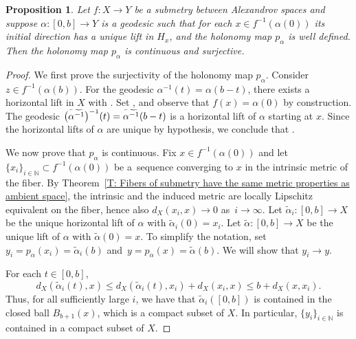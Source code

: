 \documentclass[10pt,a4paper]{amsart}
\numberwithin{equation}{section}
\newtheorem{prop}[thm]{Proposition}
\theoremstyle{definition}
\newcommand{\N}{\mathbb{N}} %
\begin{document}
\begin{prop}\label{L: holonomy maps are surjective and continuous}
Let $f\colon X\to Y$ be a submetry between Alexandrov spaces and
suppose $\alpha\colon [0,b]\to Y$ is a geodesic such that for each $x\in f^{-1}(\alpha(0))$ its initial direction has a unique lift in $H_x$, and the holonomy map $p_\alpha$ is well defined. Then the holonomy map $p_\alpha$ is continuous and surjective.
\end{prop}



\begin{proof}

We first prove the surjectivity of the holonomy map $p_\alpha$. Consider $z\in f^{-1}(\alpha(b))$. For the geodesic $\alpha^{-1}(t)= \alpha(b-t)$, there exists a horizontal lift  in $X$ with . Set , and observe that $f(x) = \alpha(0)$ by construction. The geodesic $\smash{\bigl(\widetilde{\alpha^{-1}}\bigr)^{-1}(t)} = \smash{\widetilde{\alpha^{-1}}(b-t)}$ is a horizontal lift of $\alpha$ starting at $x$. Since the horizontal lifts of $\alpha$ are unique by hypothesis, we conclude that .

We now prove that $p_\alpha$ is continuous. Fix $x\in f^{-1}(\alpha(0))$ and let $\{x_i\}_{i\in \N}\subset f^{-1}(\alpha(0))$ be a~sequence converging to $x$ in the intrinsic metric of the fiber. By Theorem~\ref{T: Fibers of submetry have the same metric properties as ambient space}, the intrinsic and the induced metric are locally Lipschitz equivalent on the fiber, hence also $d_X(x_i,x)\to 0$ as~${i\to \infty}$.
Let $\tilde{\alpha}_i\colon [0,b]\to X$ be the unique horizontal lift of $\alpha$ with $\tilde{\alpha}_i(0) = x_i$. Let $\tilde{\alpha}\colon [0,b]\to X$ be the unique lift of $\alpha$ with $\tilde{\alpha}(0) = x$. To simplify the notation, set $y_i = p_{\alpha}(x_i) = \tilde{\alpha}_i(b)$ and~${y = p_\alpha(x) = \tilde{\alpha}(b)}$. We will show that $y_i\to y$.

For each $t\in [0,b]$,
\[
d_X(\tilde{\alpha}_i(t),x)\leq d_X(\tilde{\alpha}_i(t),x_i)+d_X(x_i,x) \leq b+ d_X(x,x_i).
\]
Thus, for all sufficiently large $i$, we have that $\tilde{\alpha}_i([0,b])$ is contained in the closed ball $B_{b+1}(x)$, which is a compact subset of $X$. In particular, $\{y_i\}_{i\in\mathbb{N}}$ is contained in a compact subset of $X$.


\end{proof}
\end{document}
